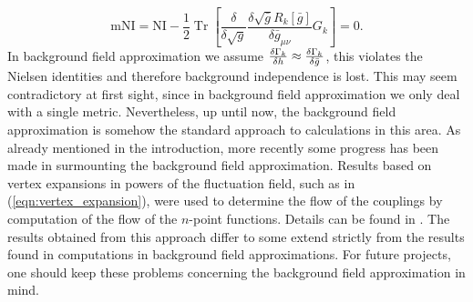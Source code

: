 \begin{equation}
	\mathrm{mNI}=\mathrm{NI}-\frac{1}{2} \operatorname{Tr}\left[\frac{\delta}{\delta\sqrt{g}} \frac{\delta \sqrt{\bar{g}} R_{k}[\bar{g}]}{\delta \bar{g}_{\mu \nu}} G_{k}\right]=0.
\end{equation}
In background field approximation we assume $\frac{\delta\Gamma_{k}}{\delta h}\approx\frac{\delta\Gamma_{k}}{\delta \bar{g}}$, this violates the Nielsen identities and therefore background independence is lost. This may seem contradictory at first sight, since in background field approximation we only deal with a single metric. Nevertheless, up until now, the background field approximation is somehow the standard approach to calculations in this area.
As already mentioned in the introduction, more recently some progress has been made in surmounting the background field approximation. Results based on vertex expansions in powers of the fluctuation field, such as in (\ref{eqn:vertex_expansion}), were used to determine the flow of the couplings by computation of the flow of the $n$-point functions. Details can be found in \cite{ChristiansenLitimPawlowskiReichert2018,MeibohmPawlowskiReichert2015}. The results obtained from this approach differ to some extend strictly from the results found in computations in background field approximations. For future projects, one should keep these problems concerning the background field approximation in mind.